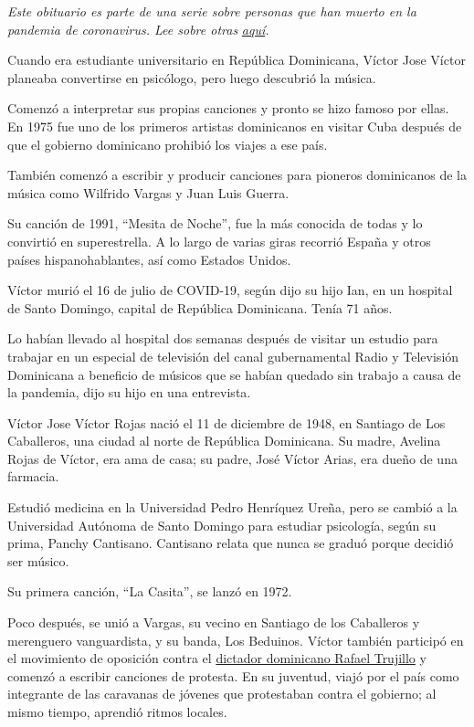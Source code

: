 \emph{Este obituario es parte de una serie sobre personas que han muerto
en la pandemia de coronavirus. Lee sobre otras}
\href{https://www.nytimes.com/interactive/2020/obituaries/people-died-coronavirus-obituaries.html}{\emph{aquí}}\emph{.}

Cuando era estudiante universitario en República Dominicana, Víctor Jose
Víctor planeaba convertirse en psicólogo, pero luego descubrió la
música.

Comenzó a interpretar sus propias canciones y pronto se hizo famoso por
ellas. En 1975 fue uno de los primeros artistas dominicanos en visitar
Cuba después de que el gobierno dominicano prohibió los viajes a ese
país.

También comenzó a escribir y producir canciones para pioneros
dominicanos de la música como Wilfrido Vargas y Juan Luis Guerra.

Su canción de 1991, ``Mesita de Noche'', fue la más conocida de todas y
lo convirtió en superestrella. A lo largo de varias giras recorrió
España y otros países hispanohablantes, así como Estados Unidos.

Víctor murió el 16 de julio de COVID-19, según dijo su hijo Ian, en un
hospital de Santo Domingo, capital de República Dominicana. Tenía 71
años.

Lo habían llevado al hospital dos semanas después de visitar un estudio
para trabajar en un especial de televisión del canal gubernamental Radio
y Televisión Dominicana a beneficio de músicos que se habían quedado sin
trabajo a causa de la pandemia, dijo su hijo en una entrevista.

Víctor Jose Víctor Rojas nació el 11 de diciembre de 1948, en Santiago
de Los Caballeros, una ciudad al norte de República Dominicana. Su
madre, Avelina Rojas de Víctor, era ama de casa; su padre, José Víctor
Arias, era dueño de una farmacia.

Estudió medicina en la Universidad Pedro Henríquez Ureña, pero se cambió
a la Universidad Autónoma de Santo Domingo para estudiar psicología,
según su prima, Panchy Cantisano. Cantisano relata que nunca se graduó
porque decidió ser músico.

Su primera canción, ``La Casita'', se lanzó en 1972.

Poco después, se unió a Vargas, su vecino en Santiago de los Caballeros
y merenguero vanguardista, y su banda, Los Beduinos. Víctor también
participó en el movimiento de oposición contra el
\href{https://www.nytimes.com/1959/07/06/archives/dominican-dictator-rafael-leonidas-trujillo-molina.html}{dictador
dominicano Rafael Trujillo} y comenzó a escribir canciones de protesta.
En su juventud, viajó por el país como integrante de las caravanas de
jóvenes que protestaban contra el gobierno; al mismo tiempo, aprendió
ritmos locales.

